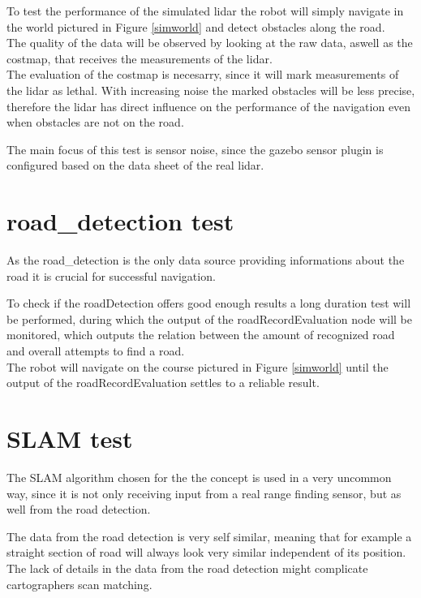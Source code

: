 To test the performance of the simulated lidar the robot will simply navigate in the world pictured in Figure \ref{simworld} and detect obstacles along the road.\\

The quality of the data will be observed by looking at the raw data, aswell as the costmap, that receives the measurements of the lidar.\\

The evaluation of the costmap is necesarry, since it will mark measurements of the lidar as lethal. With increasing noise the marked obstacles will be less precise, therefore the lidar has direct influence on the performance of the navigation even when obstacles are not on the road.

The main focus of this test is sensor noise, since the gazebo sensor plugin is configured based on the data sheet of the real lidar.

\section{road\_detection test}
As the road\_detection is the only data source providing informations about the road it is crucial for successful navigation.

To check if the roadDetection offers good enough results a long duration test will be performed, during which the output of the roadRecordEvaluation node will be monitored, which outputs the relation between the amount of recognized road and overall attempts to find a road.\\

The robot will navigate on the course pictured in Figure \ref{simworld} until the output of the roadRecordEvaluation settles to a reliable result.

\section{SLAM test}
The SLAM algorithm chosen for the the concept is used in a very uncommon way, since it is not only receiving input from a real range finding sensor, but as well from the road detection.

The data from the road detection is very self similar, meaning that for example a straight section of road will always look very similar independent of its position. The lack of details in the data from the road detection might complicate cartographers scan matching.

